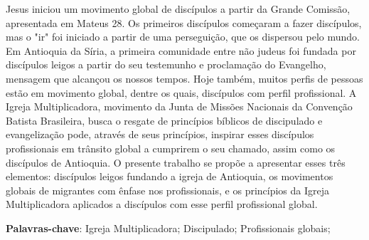 \documentclass[12pt,openright,oneside,a4paper]{abntex2}
\begin{document}

\begin{resumo} 
  \SingleSpacing
	Jesus iniciou um movimento global de discípulos a partir da Grande Comissão, apresentada em Mateus 28. Os primeiros discípulos começaram a fazer discípulos, mas o "ir" foi iniciado a partir de uma perseguição, que os dispersou pelo mundo. Em Antioquia da Síria, a primeira comunidade entre não judeus foi fundada por discípulos leigos a partir do seu testemunho e proclamação do Evangelho, mensagem que alcançou os nossos tempos. Hoje também, muitos perfis de pessoas estão em movimento global, dentre os quais, discípulos com perfil profissional. A Igreja Multiplicadora, movimento da Junta de Missões Nacionais da Convenção Batista Brasileira, busca o resgate de princípios bíblicos de discipulado e evangelização pode, através de seus princípios, inspirar esses discípulos profissionais em trânsito global a cumprirem o seu chamado, assim como os discípulos de Antioquia. O presente trabalho se propõe a apresentar esses três elementos: discípulos leigos fundando a igreja de Antioquia, os movimentos globais de migrantes com ênfase nos profissionais, e os princípios da Igreja Multiplicadora aplicados a discípulos com esse perfil profissional global.
  
\vspace{\onelineskip} 
\noindent 
\textbf{Palavras-chave}: Igreja Multiplicadora; Discipulado; Profissionais globais;
\end{resumo} 
\end{document}
